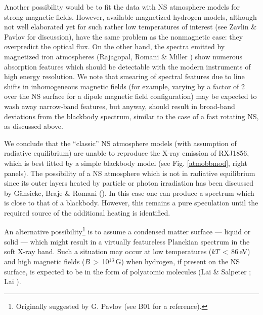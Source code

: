 \documentclass[twocolumn]{aa}
\newcommand{\modi}[1]{{#1}}
\begin{document}
Another possibility would be to fit the data with NS 
atmosphere models for strong magnetic fields.
However, available magnetized hydrogen models, although 
not well elaborated yet for such rather low temperatures 
of interest (see Zavlin \& Pavlov \cite{ZavPav02} for 
discussion), have the same problem as the nonmagnetic 
case: they overpredict the optical flux.
On the other hand, the spectra emitted by magnetized
iron atmospheres (Rajagopal, Romani \& Miller \cite{RajRomMil97})
show numerous absorption features which should be 
detectable with the modern instruments of high energy 
resolution.
We note that smearing of spectral features due to line 
shifts in inhomogeneous magnetic fields (for example,
varying by a factor of 2 over the NS surface for a dipole 
magnetic field configuration) may be expected to wash away  
narrow-band features, but anyway, should result in 
broad-band deviations from the blackbody spectrum, similar 
to the case of a fast rotating NS, as discussed above.

We conclude that the ``classic'' NS atmosphere models (with 
assumption of radiative equilibrium) are unable to reproduce 
the X-ray emission of RXJ1856, which is best fitted by a 
simple blackbody model (see Fig. \ref{atmobbmod}, right panels).
The possibility of a NS atmosphere which is not in radiative 
equilibrium since its outer layers heated by particle or photon
irradiation has been discussed by G\"{a}nsicke, Braje \& Romani 
(\cite{GaeBraRom02}). 
In this case one can produce a spectrum which is close to that 
of a blackbody.
However, this remains a pure speculation until the required
source of the additional heating is identified.

An alternative possibility\footnote{Originally suggested by 
G. Pavlov (see B01 for a reference).} is to assume a condensed 
matter surface --- liquid or solid ---  which might result in 
a virtually featureless \modi{Planckian} spectrum in the soft 
X-ray band.
Such a situation may occur at low temperatures ($kT$\,$<$\,86\,eV) 
and high magnetic fields ($B$\,$>$\,10$^{13}$\,G) when hydrogen,
if present on the NS surface, is expected to be in the form of 
polyatomic molecules (Lai \& Salpeter \cite{LaiSal97}; Lai \cite{Lai01}).
\end{document}
